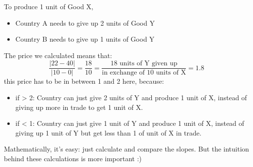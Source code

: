 \documentclass[twoside]{article}
\theoremstyle{definition}
\begin{document}
    To produce 1 unit of Good X, 
    \begin{itemize}
        \item Country A needs to give up 2 units of Good Y
        \item Country B needs to give up 1 units of Good Y
    \end{itemize}
    
    The price we calculated means that:
    $$
    \frac{\lvert 22-40 \rvert}{\lvert 10- 0 \rvert} = \frac{18}{10} = \frac{18  \text{ units of Y given up}}{\text{in exchange of } 10 \text{ units of X}} = 1.8
    $$
    this price has to be in between 1 and 2 here, because:
    \begin{itemize}
        \item if > 2: Country can just give 2 units of Y and produce 1 unit of X, instead of giving up more in trade to get 1 unit of X. 
        \item if < 1: Country can just give 1 unit of Y and produce 1 unit of X, instead of giving up 1 unit of Y but get less than 1 of unit of X in trade.
    \end{itemize}


\vspace{20pt}

Mathematically, it's easy: just calculate and compare the slopes. But the intuition behind these calculations is more important :)

%
%
\end{document}
